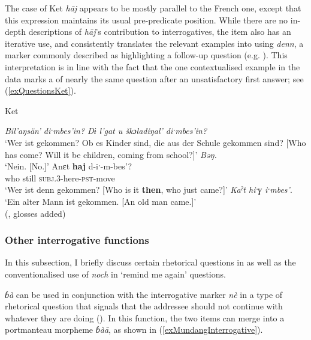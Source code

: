 The case of Ket \textit{hāj} appears to be mostly parallel to the French one, except that this expression maintains its usual pre-predicate position. While there are no in-depth descriptions of \textit{hāj}'s contribution to interrogatives, the item also has an iterative use, and \textcite{Werner1997} consistently translates the relevant examples into  using \textit{denn}, a marker commonly described as highlighting a follow-up question (e.g. \cite{Wegener2001}). This interpretation is in line with the fact that the one contextualised example in the data marks a  of nearly the same question after an unsatisfactory first answer; see (\ref{exQuestionsKet}).\pagebreak

\begin{exe}
	\ex Ket\label{exQuestionsKet}
	\begin{xlist}
		 \textit{Bil\rq{}aŋsän\rq{} diˑmbes\rq{}in? Dɨ l\rq{}gat u škɔladiŋal\rq{} diˑmbes\rq{}in?}\\
	\lq Wer ist gekommen? Ob es Kinder sind, die aus der Schule gekommen sind? [Who has come? Will it be children, coming from school?]\rq
	 \textit{Bəŋ.}\\
	\lq Nein. [No.]\rq
	\gll Anεt \textbf{haj} d-iˑ-m-bes\rq{}?\\
	who still \textsc{subj}.3-here-\textsc{pst}-move\\
	\glt \lq Wer ist denn gekommen? [Who is it \textbf{then}, who just came?]\rq{ }
	 \textit{Kaˀt hiˑɣ iˑmbes\rq{}}.\\
	\lq Ein alter Mann ist gekommen. [An old man came.]\rq{}
	\\(\cite[366–367]{Werner1997}, glosses added)
	\end{xlist}
\end{exe}

\subsubsection{Other interrogative functions}\label{sectionInterrogativeOther}
In this subsection, I briefly discuss certain rhetorical questions in  as well as the conventionalised use of  \textit{noch} in \lq remind me again\rq{ }questions. 

 \textit{ɓà} can be used in conjunction with the interrogative marker \textit{nè} in a type of rhetorical question that signals that the addressee should not continue with whatever they are doing (). In this function, the two items can merge into a portmanteau morpheme \textit{ɓàā}, as shown in (\ref{exMundangInterrogative}).

